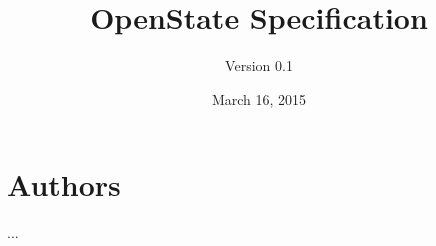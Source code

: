 \documentclass[a4paper,11pt,oneside]{scrreprt}
\title{OpenState Specification}
\subtitle{Version 0.1}
\author{}
\date{March 16, 2015}
\begin{document}
\maketitle


\tableofcontents

\newpage
\clearpage










\section*{Authors}
...

\end{document}
